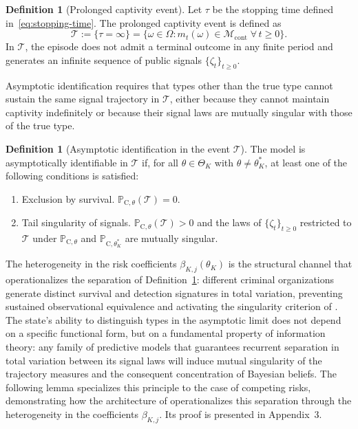 \documentclass[ecta,nameyear,draft]{econsocart}
\theoremstyle{plain}
\theoremstyle{definition}
\newtheorem{definition}[theorem]{Definition}
\newcommand{\ProbC}[1]{\mathbb{P}_{\mathrm{C},#1}}
\newcommand{\ThetaK}{\Theta_K}
\newcommand{\1}{\mathbf{1}}
\begin{document}
\begin{definition}[Prolonged captivity event]\label{def:event-T-long}
Let $\tau$ be the stopping time defined in~\eqref{eq:stopping-time}. The prolonged captivity event is defined as
\[
\mathcal{T}:=\{\tau=\infty\}=\bigl\{\omega\in\Omega:m_t(\omega)\in\mathcal{M}_{\mathrm{cont}}\;\forall\,t\ge 0\bigr\}.
\]
In $\mathcal{T}$, the episode does not admit a terminal outcome in any finite period and generates an infinite sequence of public signals $\{\zeta_t\}_{t\ge 0}$.
\end{definition}

Asymptotic identification requires that types other than the true type cannot sustain the same signal trajectory in $\mathcal{T}$, either because they cannot maintain captivity indefinitely or because their signal laws are mutually singular with those of the true type.

\begin{definition}[Asymptotic identification in the event $\mathcal{T}$]\label{def:asymptotic-id}
The model is asymptotically identifiable in $\mathcal{T}$ if, for all $\theta\in\ThetaK$ with $\theta\neq\theta_K^\ast$, at least one of the following conditions is satisfied:
\begin{enumerate}
  \item[\textup{(a)}] Exclusion by survival. $\ProbC{\theta}(\mathcal{T})=0$.
  \item[\textup{(b)}] Tail singularity of signals. $\ProbC{\theta}(\mathcal{T})>0$ and the laws of $\{\zeta_t\}_{t\ge 0}$ restricted to $\mathcal{T}$ under $\ProbC{\theta}$ and $\ProbC{\theta_K^\ast}$ are mutually singular.
\end{enumerate}
\end{definition}

The heterogeneity in the risk coefficients $\beta_{K,j}(\theta_K)$ is the structural channel that operationalizes the separation of Definition~\ref{def:asymptotic-id}: different criminal organizations generate distinct survival and detection signatures in total variation, preventing sustained observational equivalence and activating the singularity criterion of \citet{Kakutani1948}. The state's ability to distinguish types in the asymptotic limit does not depend on a specific functional form, but on a fundamental property of information theory: any family of predictive models that guarantees recurrent separation in total variation between its signal laws will induce mutual singularity of the trajectory measures and the consequent concentration of Bayesian beliefs. The following lemma specializes this principle to the case of competing risks, demonstrating how the architecture of \citet{Cox1972} operationalizes this separation through the heterogeneity in the coefficients $\beta_{K,j}$. Its proof is presented in Appendix~3.
\end{document}
